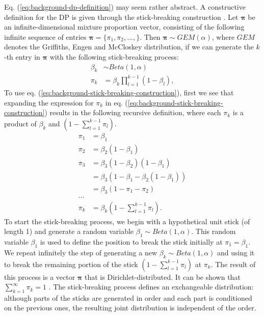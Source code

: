 Eq. (\ref{eq:background-dp-definition}) may seem rather abstract. A constructive definition for the DP is given through the stick-breaking construction \cite{ishwaran2011gibbs}. Let $\boldsymbol{\pi}$ be an infinite-dimensional mixture proportion vector, consisting of the following infinite sequence of entries $\boldsymbol{\pi}=\{\pi_1, \pi_2, ..., \}$. Then $\boldsymbol{\pi} \sim GEM(\alpha)$, where $GEM$ denotes the Griffiths, Engen and McCloskey distribution, if we can generate the $k$-th entry in $\boldsymbol{\pi}$ with the following stick-breaking process:
\begin{equation}
\begin{aligned}
\beta_k &\sim Beta(1, \alpha) \\
\pi_k     &= \beta_k \prod_{l=1}^{k-1} (1-\beta_l),
\end{aligned}
\label{eq:background-stick-breaking-construction}
\end{equation}
To use eq. (\ref{eq:background-stick-breaking-construction}), first we see that expanding the expression for $\pi_k$ in eq. (\ref{eq:background-stick-breaking-construction}) results in the following recursive definition, where each $\pi_k$ is a product of $\beta_k$ and $(1-\sum_{l=1}^{k-1} \pi_l)$.
\begin{equation}
\begin{aligned}
\pi_1 &= \beta_1 \\
\pi_2 &= \beta_2(1-\beta_1) \\
\pi_3 &= \beta_3(1-\beta_2)(1-\beta_1) \\
         &= \beta_3(1-\beta_1-\beta_2(1-\beta_1)) \\
         &= \beta_3(1-\pi_1-\pi_2) \\
... \\
\pi_k &= \beta_k(1-\sum_{l=1}^{k-1} \pi_l).
\end{aligned}
\label{eq:background-pi-gem}
\end{equation}
To start the stick-breaking process, we begin with a hypothetical unit stick (of length 1) and generate a random variable $\beta_1 \sim Beta(1, \alpha)$. This random variable $\beta_1$ is used to define the position to break the stick initially at $\pi_1 = \beta_1$. We repeat infinitely the step of generating a new $\beta_k \sim Beta(1, \alpha)$ and using it to break the remaining portion of the stick $(1-\sum_{l=1}^{k-1} \pi_l)$ at $\pi_k$. The result of this process is a vector $\boldsymbol{\pi}$ that is Dirichlet-distributed. It can be shown that $\sum_{k=1}^{\infty} \pi_k=1$ \cite{ishwaran2011gibbs}. The stick-breaking process defines an exchangeable distribution: although parts of the sticks are generated in order and each part is conditioned on the previous ones, the resulting joint distribution is independent of the order.

